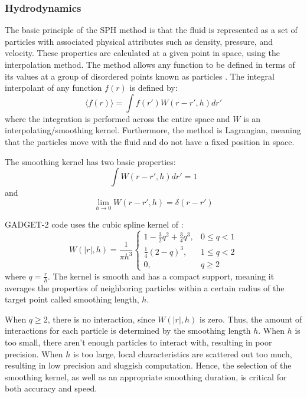 \subsubsection{Hydrodynamics}

The basic principle of the SPH method is that the fluid is represented as a set of particles with associated physical attributes such as density, pressure, and velocity. These properties are calculated at a given point in space, using the interpolation method. The method allows any function to be defined in terms of its values at a group of disordered points known as particles \citep{monaghan1982particle}. The integral interpolant of any function $f(r)$ is defined by:
\begin{equation}\label{eq:interpolant}
    \langle f(r) \rangle = \int f(r') W(r-r',h) dr'
\end{equation}
where the integration is performed across the entire space and $W$ is an interpolating/smoothing kernel. Furthermore, the method is Lagrangian, meaning that the particles move with the fluid and do not have a fixed position in space.

The smoothing kernel has two basic properties:
\begin{equation}\label{eq:kernel_property_1}
    \int W(r-r',h) dr' = 1
\end{equation}
and
\begin{equation}\label{eq:kernel_property_2}
   \lim_{h\to0} W(r-r',h) = \delta(r-r')
\end{equation}

GADGET-2 code uses the cubic spline kernel of \cite{monaghan1985refined}:
\begin{equation}\label{eq:spline_kernel}
  W(|r|,h) = \frac{1}{\pi h^3}
    \begin{cases}
      1 - \frac{3}{2}q^2 + \frac{3}{4}q^3, & 0 \leq q < 1\\
      \frac{1}{4}(2 - q)^3, & 1 \leq q <2 \\
      0, &  q \geq 2
    \end{cases}       
\end{equation}
where $q = \frac{r}{h}$. The kernel is smooth and has a compact support, meaning it averages the properties of neighboring particles within a certain radius of the target point called smoothing length, $h$. 

When $q \geq 2$, there is no interaction, since $W(|r|,h)$ is zero. Thus, the amount of interactions for each particle is determined by the smoothing length $h$. When $h$ is too small, there aren't enough particles to interact with, resulting in poor precision. When $h$ is too large, local characteristics are scattered out too much, resulting in low precision and sluggish computation. Hence, the selection of the smoothing kernel, as well as an appropriate smoothing duration, is critical for both accuracy and speed. 

